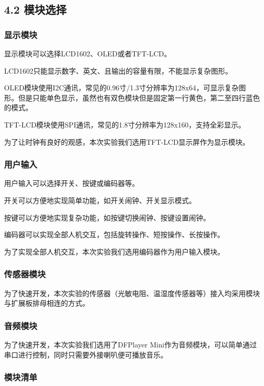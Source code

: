 \documentclass[12pt,a4paper]{article}
\begin{document}
\subsection*{4.2 模块选择}

\subsubsection*{显示模块}
显示模块可以选择LCD1602、OLED或者TFT-LCD。

LCD1602只能显示数字、英文、且输出的容量有限，不能显示复杂图形。

OLED模块使用I2C通讯，常见的0.96寸/1.3寸分辨率为128x64，可显示复杂图形。但是只能单色显示，虽然也有双色模块但是固定第一行黄色，第二至四行蓝色的模式。

TFT-LCD模块使用SPI通讯，常见的1.8寸分辨率为128x160，支持全彩显示。

为了让时钟有良好的观感，本次实验我们选用TFT-LCD显示屏作为显示模块。

\subsubsection*{用户输入}

用户输入可以选择开关、按键或编码器等。

开关可以方便地实现简单功能，如开关闹钟、开关显示模式。

按键可以方便地实现复杂功能，如按键切换闹钟、按键设置闹钟。

编码器可以实现全部人机交互，包括旋转操作、短按操作、长按操作。

为了实现全部人机交互，本次实验我们选用编码器作为用户输入模块。

\subsubsection*{传感器模块}

为了快速开发，本次实验的传感器（光敏电阻、温湿度传感器等）接入均采用模块与扩展板排母相连的方式。


\subsubsection*{音频模块}

为了快速开发，本次实验我们选用了DFPlayer Mini作为音频模块，可以简单通过串口进行控制，同时只需要外接喇叭便可播放音乐。

\subsubsection*{模块清单}
\end{document}
